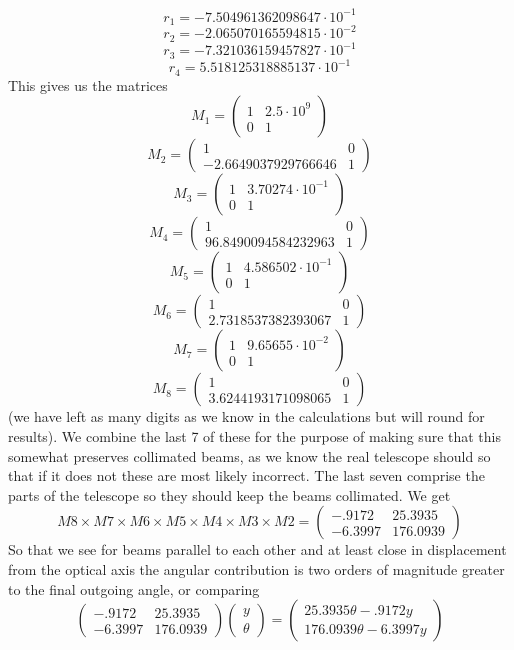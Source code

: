 \documentclass[11pt]{amsart}
\makeatletter
\newcommand{\0}{\varnothing}		%
\newcommand{\ti}{\cdot}			%
\newcommand{\1}{!}
\newcommand{\2}{@}
\newcommand{\3}{\#}
\newcommand{\4}{\$}
\newcommand{\5}{\%}
\newcommand{\6}{$^\wedge$}
\newcommand{\7}{\&}
\newcommand{\8}{*}
\newcommand{\9}{(}
\makeatother
\begin{document}
\[
r_1 = -7.504961362098647\ti 10^{-1}
\]
\[
r_2 = -2.065070165594815\ti 10^{-2}
\]
\[
r_3 = -7.321036159457827\ti 10^{-1}
\]
\[
r_4 = 5.518125318885137\ti 10^{-1}
\]
This gives us the matrices
\[
M_1 = \begin{pmatrix} 1	&	2.5\ti 10^9\\	0	&	1 \end{pmatrix}
\]
\[
M_2 = \begin{pmatrix} 1&0\\ -2.6649037929766646 & 1
\end{pmatrix}
\]
\[
M_3=
\begin{pmatrix}
1	&	3.70274\ti 10^{-1}	\\	0	&	1
\end{pmatrix}
\]
\[
M_4=
\begin{pmatrix}
1	&	0	\\	96.8490094584232963	&	1
\end{pmatrix}
\]
\[
M_5=
\begin{pmatrix}
1	&	4.586502\ti 10^{-1}	\\	0	&	1
\end{pmatrix}
\]
\[
M_6=
\begin{pmatrix}
1	&	0	\\	2.7318537382393067	&	1
\end{pmatrix}
\]
\[
M_7=
\begin{pmatrix}
1	&	9.65655 \ti 10^{-2}	\\	0	&	1
\end{pmatrix}
\]
\[
M_8=
\begin{pmatrix}
1	&	0	\\	3.6244193171098065	&	1
\end{pmatrix}
\]
(we have left as many digits as we know in the calculations but will round for results). We combine the last 7 of these for the purpose of making sure that this somewhat preserves collimated beams, as we know the real telescope should so that if it does not these are most likely incorrect. The last seven comprise the parts of the telescope so they should keep the beams collimated. We get
\[
M8\times M7\times M6\times M5\times M4\times M3\times M2 = \begin{pmatrix}
-.9172	&	25.3935
\\
-6.3997	&	176.0939
\end{pmatrix}
\]
So that we see for beams parallel to each other and at least close in displacement from the optical axis the angular contribution is two orders of magnitude greater to the final outgoing angle, or comparing
\[
\begin{pmatrix}
-.9172	&	25.3935
\\
-6.3997	&	176.0939
\end{pmatrix}
\begin{pmatrix}
y \\ \theta
\end{pmatrix} = \begin{pmatrix}25.3935\theta -.9172 y\\ 176.0939 \theta -6.3997 y\end{pmatrix}
\]
\end{document}
